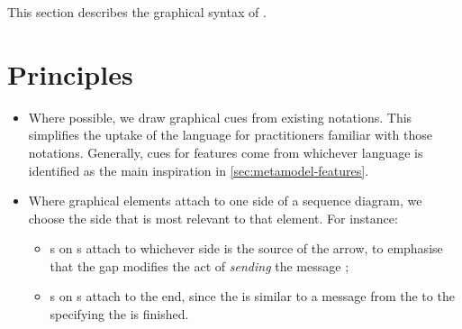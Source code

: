 This section describes the graphical syntax of \langname.


\section{Principles}


\begin{itemize}
\item Where possible, we draw graphical cues from existing notations.
  This simplifies the uptake of the language for practitioners
  familiar with those notations.  Generally, cues for features come
  from whichever language is identified as the main inspiration in
  \cref{sec:metamodel-features}.
\item Where graphical elements attach to one side of a sequence diagram,
  we choose the side that is most relevant to that element.  For instance:
  \begin{itemize}
  \item \msequencegap s on \marrowaction s attach to whichever
    side is the source of the arrow, to emphasise that the gap modifies
    the act of \emph{sending} the message ;
  \item \msequencegap s on \mfinalaction s attach to the \mtarget{} end,
    since the \mfinalaction{} is similar to a message from the \mtarget{} to
    the \mworld{} specifying the \mtarget{} is finished.
  \end{itemize}
\end{itemize}


